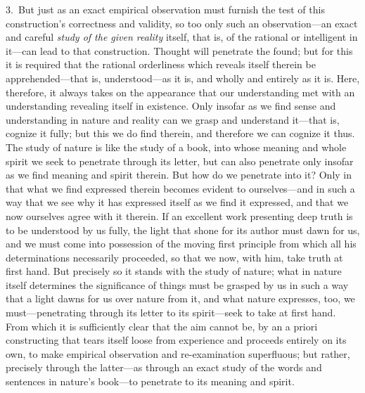 \documentclass[12pt,a4paper]{book}
\begin{document}
3.~But just as an exact empirical observation must furnish the test of this
construction's correctness and validity, so too only such an observation---an exact
and careful \emph{study of the given reality} itself, that is, of the rational or
intelligent in it---can lead to that construction. Thought will penetrate the
found; but for this it is required that the rational orderliness which reveals
itself therein be apprehended---that is, understood---as it is, and wholly and
entirely as it is. Here, therefore, it always takes on the appearance that our
understanding met with an understanding revealing itself in existence. Only
insofar as we find sense and understanding in nature and reality can we grasp and
understand it---that is, cognize it fully; but this we do find therein, and
therefore we can cognize it thus. The study of nature is like the study of a book,
into whose meaning and whole spirit we seek to penetrate through its letter, but
can also penetrate only insofar as we find meaning and spirit therein. But how do
we penetrate into it? Only in that what we find expressed therein becomes evident
to ourselves---and in such a way that we see why it has expressed itself as we
find it expressed, and that we now ourselves agree with it therein. If an
excellent work presenting deep truth is to be understood by us fully, the light
that shone for its author must dawn for us, and we must come into possession of the
moving first principle from which all his determinations necessarily proceeded, so
that we now, with him, take truth at first hand. But precisely so it stands with
the study of nature; what in nature itself determines the significance of things
must be grasped by us in such a way that a light dawns for us over nature from it,
and what nature expresses, too, we must---penetrating through its letter to its
spirit---seek to take at first hand. From which it is sufficiently clear that the
aim cannot be, by an a priori constructing that tears itself loose from experience
and proceeds entirely on its own, to make empirical observation and re-examination
superfluous; but rather, precisely through the latter---as through an exact study
of the words and sentences in nature's book---to penetrate to its meaning and
spirit.
\end{document}
